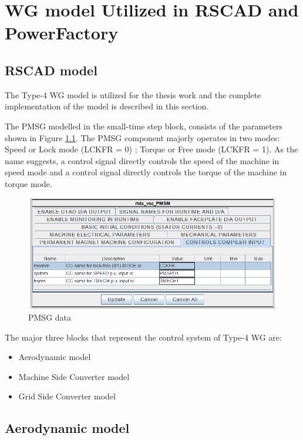 \chapter{WG model Utilized in RSCAD and PowerFactory}\label{Appendix_A}

\section{RSCAD model}

The Type-4 \gls{WG} model is utilized for the thesis work and the complete implementation of the model is described in this section. 

The \gls{PMSG} modelled in the small-time step block, consists of the parameters shown in Figure \ref{fig:PMSG_block_para}. The \gls{PMSG} component majorly operates in two modes: Speed or Lock mode (LCKFR = 0) ; Torque or Free mode (LCKFR = 1).
As the name suggests, a control signal directly controls the speed of the machine in speed mode and a control signal directly controls the torque of the machine in torque mode.  

\begin{figure}[H]
\centering
    \includegraphics[height = 5cm,width = 11.5cm]{Diagrams/Appendix_A/PMSG_block_para.PNG}
    \caption{PMSG data}
    \label{fig:PMSG_block_para}
\end{figure}

The major three blocks that represent the control system of Type-4 \gls{WG} are:
\begin{itemize}
    \item Aerodynamic model
    \item Machine Side Converter model
    \item Grid Side Converter model
\end{itemize}

\section{Aerodynamic model}

